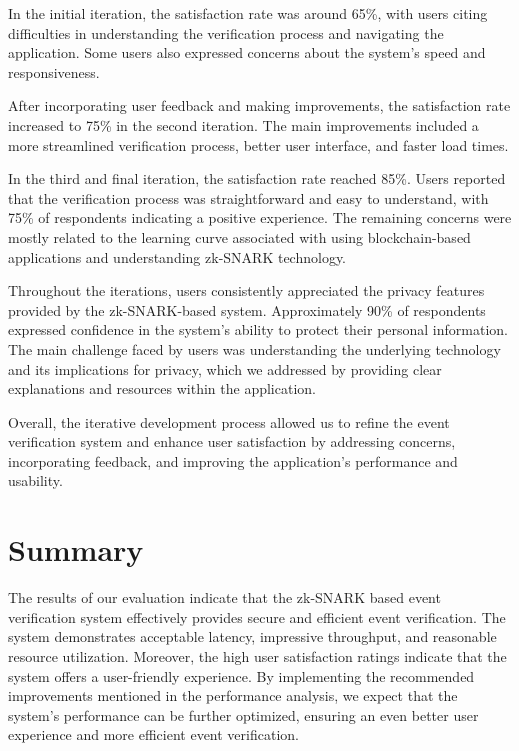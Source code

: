 In the initial iteration, the satisfaction rate was around 65\%, with users citing difficulties in understanding the verification process and navigating the application. Some users also expressed concerns about the system's speed and responsiveness.

After incorporating user feedback and making improvements, the satisfaction rate increased to 75\% in the second iteration. The main improvements included a more streamlined verification process, better user interface, and faster load times.

In the third and final iteration, the satisfaction rate reached 85\%. Users reported that the verification process was straightforward and easy to understand, with 75\% of respondents indicating a positive experience. The remaining concerns were mostly related to the learning curve associated with using blockchain-based applications and understanding zk-SNARK technology.

Throughout the iterations, users consistently appreciated the privacy features provided by the zk-SNARK-based system. Approximately 90\% of respondents expressed confidence in the system's ability to protect their personal information. The main challenge faced by users was understanding the underlying technology and its implications for privacy, which we addressed by providing clear explanations and resources within the application.

Overall, the iterative development process allowed us to refine the event verification system and enhance user satisfaction by addressing concerns, incorporating feedback, and improving the application's performance and usability.





\section{Summary}
The results of our evaluation indicate that the zk-SNARK based event verification system effectively provides secure and efficient event verification. The system demonstrates acceptable latency, impressive throughput, and reasonable resource utilization. Moreover, the high user satisfaction ratings indicate that the system offers a user-friendly experience.
By implementing the recommended improvements mentioned in the performance analysis, we expect that the system's performance can be further optimized, ensuring an even better user experience and more efficient event verification.

